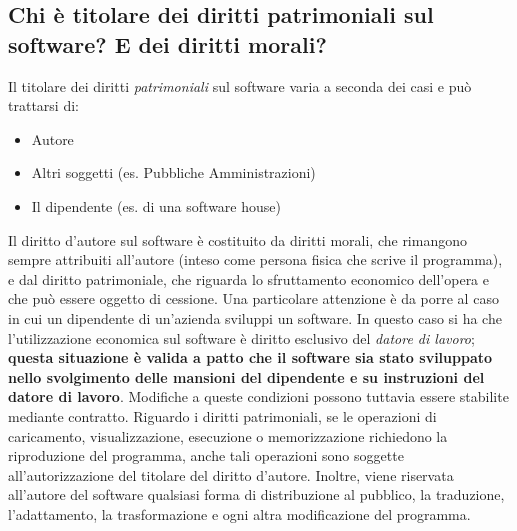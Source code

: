\subsection{Chi è titolare dei diritti patrimoniali sul software? E dei diritti morali?}
Il titolare dei diritti \emph{patrimoniali} sul software varia a seconda dei casi e può trattarsi di:
\begin{itemize}
    \item Autore
    \item Altri soggetti (es. Pubbliche Amministrazioni)
    \item Il dipendente (es. di una software house)
\end{itemize}
Il diritto d'autore sul software è costituito da diritti morali, che rimangono sempre attribuiti all'autore
(inteso come persona fisica che scrive il programma), e dal diritto patrimoniale, che riguarda lo sfruttamento economico dell'opera
e che può essere oggetto di cessione.\newline
Una particolare attenzione è da porre al caso in cui un dipendente di un'azienda sviluppi un software. In questo caso si ha
che l'utilizzazione economica sul software è diritto esclusivo del \emph{datore di lavoro}; \textbf{questa situazione è valida a patto che
il software sia stato sviluppato nello svolgimento delle mansioni del dipendente e su instruzioni del datore di lavoro}. Modifiche a
queste condizioni possono tuttavia essere stabilite mediante contratto. \newline
Riguardo i diritti patrimoniali, se le operazioni di caricamento, visualizzazione, esecuzione o
memorizzazione richiedono la riproduzione del programma, anche tali operazioni sono soggette all'autorizzazione del titolare del diritto d'autore.
Inoltre, viene riservata all'autore del software qualsiasi forma di distribuzione al pubblico, la traduzione, l'adattamento, la trasformazione e ogni
altra modificazione del programma.

